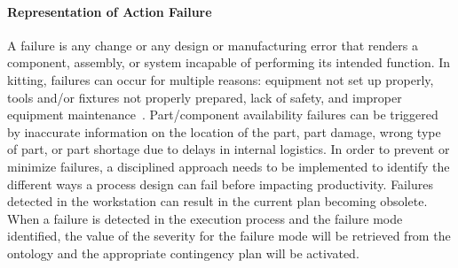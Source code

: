 \paragraph{Representation of Action Failure}\label{sss:failure}
 A failure is any change or any design or manufacturing error that renders a 
component, assembly, or system incapable of performing its intended function. 
In kitting, failures can occur for multiple reasons: equipment not set up properly, 
tools and/or fixtures not properly prepared, lack of safety, and improper equipment 
maintenance~\cite{Leger.1999,Kaiser.2007}. Part/component availability failures can be triggered by inaccurate information 
on the location of the part, part damage, wrong type of part, or part shortage due to delays 
in internal logistics. In order to prevent or minimize failures, a disciplined approach 
needs to be implemented to identify the different ways a process design can fail before 
impacting productivity. Failures detected in the workstation can result in the current 
plan becoming obsolete. When a failure is detected in the execution process and the failure 
mode identified, the value of the severity for the failure mode will be retrieved from the 
ontology and the appropriate contingency plan will be activated.
